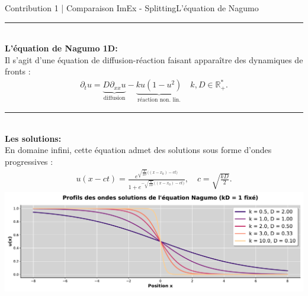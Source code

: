 \begin{frame}{Contribution 1 | Comparaison ImEx - Splitting}{L'équation de Nagumo}
    \noindent\color{Primary}\rule{\linewidth}{0.6pt}\color{black}\\
        \textbf{L'équation de Nagumo 1D:\\}
        Il s'agit d'une équation de diffusion-réaction faisant apparaître des dynamiques de fronts :
            \begin{align}
                \partial_t{u} = \underbrace{D \partial_{xx}u}_{\text{diffusion}}
                        - \underbrace{ku(1-u^2)}_{\text{réaction non. lin.}}\quad k,D \in \mathbb{R^*_+}.
            \end{align}
    \pause
    \noindent\color{Primary}\rule{\linewidth}{0.6pt}\color{black}\\
        \textbf{Les solutions:\\}
            En domaine infini, cette équation admet des solutions sous forme d'ondes progressives :
        \begin{align}\label{eq:sol_nagumo}
            u(x-ct) = \frac{e^{\sqrt{\frac{k}{2D}} \bigl((x-x_0) - ct \bigr)}}
                        {1 + e^{-\sqrt{\frac{k}{2D}} \bigl((x-x_0) - ct \bigr)}},\quad c = \sqrt{\frac{kD}{2}}.
\end{align}
\centering
\includegraphics[height = .3 \textheight]{ medias/2_/1_/profils_nagumo.pdf }
\end{frame}